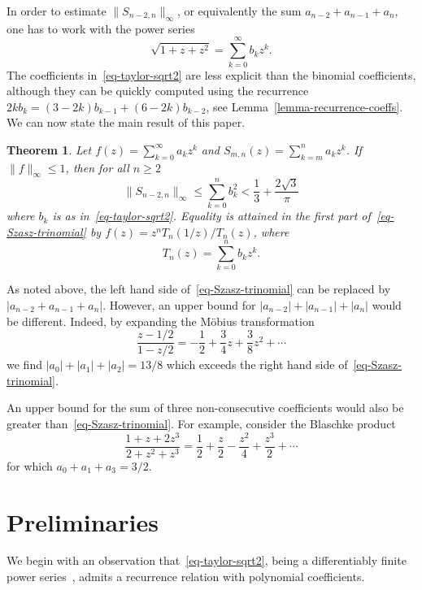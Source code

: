\documentclass[12pt]{amsart}
\newtheorem{theorem}{Theorem}[section]
\theoremstyle{definition}
\theoremstyle{remark}
\numberwithin{equation}{section}
\begin{document}
In order to estimate $\|S_{n-2, n}\|_\infty$, or equivalently the sum $a_{n-2}+a_{n-1}+a_n$, one has to work with the power series 
\begin{equation}\label{eq-taylor-sqrt2}
\sqrt{1+z+z^2} = \sum_{k=0}^\infty b_k z^k. 
\end{equation}
The coefficients in~\eqref{eq-taylor-sqrt2} are less explicit than the binomial coefficients, although they can be quickly computed using the recurrence $2k b_{k}  = (3-2k)b_{k-1} + (6-2k)b_{k-2}$, see Lemma~\ref{lemma-recurrence-coeffs}. We can now state the main result of this paper.

\begin{theorem}\label{thm-three-terms} Let $f(z)=\sum_{k=0}^\infty a_k z^k$  and $S_{m, n}(z)=\sum_{k=m}^n a_k z^k$. If $\|f\|_\infty\le 1$, then for all $n\ge 2$
\begin{equation}\label{eq-Szasz-trinomial} 
\|S_{n-2,n}\|_\infty \le \sum_{k=0}^n b_k^2 < \frac{1}{3} + \frac{2\sqrt{3}}{\pi}     
\end{equation}
where $b_k$ is as in~\eqref{eq-taylor-sqrt2}. Equality is attained in the first part of~\eqref{eq-Szasz-trinomial} by $f(z)=z^n T_n(1/z)/T_n(z)$, where   
\begin{equation}\label{eq-taylor-poly}
T_n(z) = \sum_{k=0}^n b_k z^k.
\end{equation}
\end{theorem}

As noted above, the left hand side of~\eqref{eq-Szasz-trinomial} can be replaced by $|a_{n-2}+a_{n-1}+a_n|$. However, an upper bound for $|a_{n-2}|+|a_{n-1}|+|a_n|$ would be different. Indeed, by expanding the M\"obius transformation 
\[
\frac{z-1/2}{1-z/2} = -\frac{1}{2} + \frac{3}{4}z+\frac{3}{8}z^2+\cdots
\]
we find
$|a_0|+|a_1|+|a_2| = 13/8$ which exceeds the right hand side of~\eqref{eq-Szasz-trinomial}.

An upper bound for the sum of three non-consecutive coefficients would also be greater than~\eqref{eq-Szasz-trinomial}. For example, consider the Blaschke product 
\[
\frac{1+z+2z^3}{2+z^2+z^3} = \frac{1}{2} + \frac{z}{2} - \frac{z^2}{4} + \frac{z^3}{2} + \cdots 
\]
for which $a_0+a_1+a_3 = 3/2$. 
  
\section{Preliminaries}\label{sec-preliminary}

We begin with an observation that~\eqref{eq-taylor-sqrt2}, being a differentiably finite power series~\cite{Stanley}, admits a recurrence relation with polynomial coefficients. 
\end{document}
